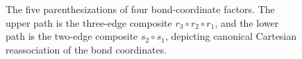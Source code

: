 \begin{figure}[ht]
    \centering
    \caption{The five parenthesizations of four bond-coordinate factors.
        The upper path is the three-edge composite
        $r_3\circ r_2\circ r_1$, and the lower path is the two-edge composite
        $s_2\circ s_1$, depicting canonical Cartesian reassociation of the
        bond coordinates.}
    \label{fig:mpdo_fourfold_bond_coordinate_reassociation}
\end{figure}
